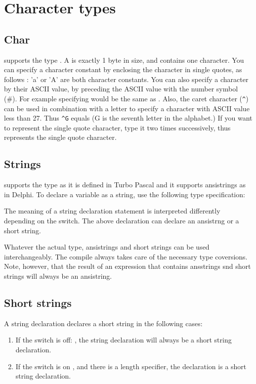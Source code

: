 \documentclass{report}
\begin{document}
\section{Character types}
\subsection{Char}
\fpc supports the type . A  is exactly 1 byte in
size, and contains one character. 
You can specify a character constant by enclosing the character in single 
quotes, as follows : 'a' or 'A' are both character constants. 
You can also specify a character by their ASCII
value, by preceding the ASCII value with the number symbol (\#). For example
specifying  would be the same as .
Also, the caret character (\verb+^+) can be used in combination with a letter to
specify a character with ASCII value less than 27. Thus \verb+^G+ equals
 (G is the seventh letter in the alphabet.)
If you want to represent the single quote character, type it two times
successively, thus  represents the single quote character.

\subsection{Strings}
\fpc supports the  type as it is defined in Turbo Pascal and
it supports ansistrings as in Delphi.
To declare a variable as a string, use the following type specification:


The meaning of a string declaration statement is interpreted differently 
depending on the  switch. The above declaration can declare an
ansistrng or a short string.

Whatever the actual type, ansistrings and short strings can be used
interchangeably. The compile always takes care of the necessary type
coversions. Note, however, that the result of an expression that contains
ansstrings snd short strings will always be an ansistring. 

\subsection{Short strings}

A string declaration declares a short string in the following cases:

\begin{enumerate}
\item If the switch is off: , the string declaration 
will always be a short string declaration.
\item If the switch is on , and there is a length
specifier, the declaration is a short string declaration.
\end{enumerate}
\end{document}
